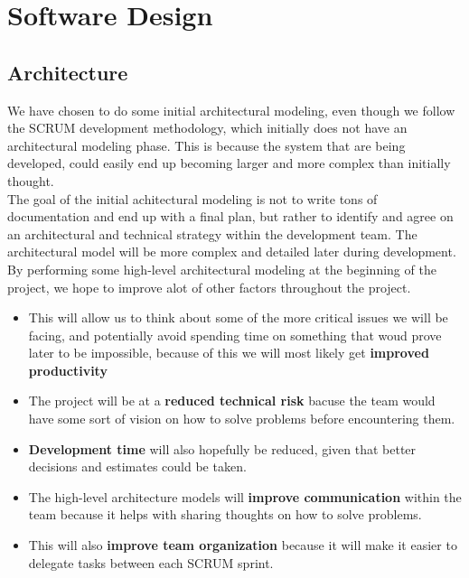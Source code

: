 \section{Software Design}
\subsection{Architecture}
We have chosen to do some initial architectural modeling, even though we follow the SCRUM development methodology, which initially does not have an architectural modeling phase. This is because the system that are being developed, could easily end up becoming larger and more complex than initially thought. \\ 
The goal of the initial achitectural modeling is not to write tons of documentation and end up with a final plan, but rather to identify and agree on an architectural and technical  strategy within the development team. The architectural model will be more complex and detailed later during development. \\
By performing some high-level architectural modeling at the beginning of the project, we hope to improve alot of other factors throughout the project. \cite{agilemodeling}

\begin{itemize}
	\item This will allow us to think about some of the more critical issues we will be facing, and potentially avoid spending time on something that woud prove later to be impossible, because of this we will most likely get \textbf{improved productivity}
	\item The project will be at a \textbf{reduced technical risk} bacuse the team would have some sort of vision on how to solve problems before encountering them. 
	\item \textbf{Development time} will also hopefully be reduced, given that better decisions and estimates could be taken.
	\item The high-level architecture models will \textbf{improve communication} within the team because it helps with sharing thoughts on how to solve problems.
	\item This will also \textbf{improve team organization} because it will make it easier to delegate tasks between each SCRUM sprint.
\end{itemize}

